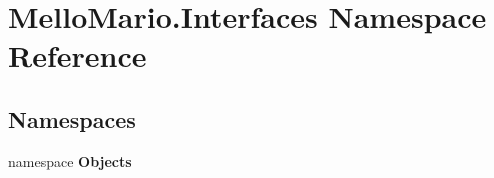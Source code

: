\section{Mello\+Mario.\+Interfaces Namespace Reference}
\label{namespaceMelloMario_1_1Interfaces}
\subsection*{Namespaces}
\begin{DoxyCompactItemize}
\item 
namespace \textbf{ Objects}
\end{DoxyCompactItemize}
